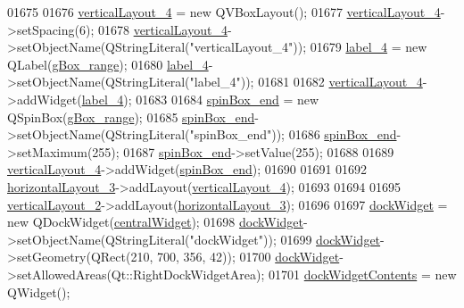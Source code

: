 \begin{DoxyCode}
01675 
01676         \hyperlink{a00080_a6f40fc110b15410c00837a446d57bdbe}{verticalLayout\_4} = \textcolor{keyword}{new} QVBoxLayout();
01677         \hyperlink{a00080_a6f40fc110b15410c00837a446d57bdbe}{verticalLayout\_4}->setSpacing(6);
01678         \hyperlink{a00080_a6f40fc110b15410c00837a446d57bdbe}{verticalLayout\_4}->setObjectName(QStringLiteral(\textcolor{stringliteral}{"verticalLayout\_4"}));
01679         \hyperlink{a00080_a78c7e10730b43c6700cd7216911ed76a}{label\_4} = \textcolor{keyword}{new} QLabel(\hyperlink{a00080_a3c12d0504a310784c3820d1a9ad469c2}{gBox\_range});
01680         \hyperlink{a00080_a78c7e10730b43c6700cd7216911ed76a}{label\_4}->setObjectName(QStringLiteral(\textcolor{stringliteral}{"label\_4"}));
01681 
01682         \hyperlink{a00080_a6f40fc110b15410c00837a446d57bdbe}{verticalLayout\_4}->addWidget(\hyperlink{a00080_a78c7e10730b43c6700cd7216911ed76a}{label\_4});
01683 
01684         \hyperlink{a00080_a8ebeb5caa10878d7806d1f548913b449}{spinBox\_end} = \textcolor{keyword}{new} QSpinBox(\hyperlink{a00080_a3c12d0504a310784c3820d1a9ad469c2}{gBox\_range});
01685         \hyperlink{a00080_a8ebeb5caa10878d7806d1f548913b449}{spinBox\_end}->setObjectName(QStringLiteral(\textcolor{stringliteral}{"spinBox\_end"}));
01686         \hyperlink{a00080_a8ebeb5caa10878d7806d1f548913b449}{spinBox\_end}->setMaximum(255);
01687         \hyperlink{a00080_a8ebeb5caa10878d7806d1f548913b449}{spinBox\_end}->setValue(255);
01688 
01689         \hyperlink{a00080_a6f40fc110b15410c00837a446d57bdbe}{verticalLayout\_4}->addWidget(\hyperlink{a00080_a8ebeb5caa10878d7806d1f548913b449}{spinBox\_end});
01690 
01691 
01692         \hyperlink{a00080_a03ce63974cc69b067c91bbf285cceca8}{horizontalLayout\_3}->addLayout(\hyperlink{a00080_a6f40fc110b15410c00837a446d57bdbe}{verticalLayout\_4});
01693 
01694 
01695         \hyperlink{a00080_a0c01bad60d9f422a1258e710635a2f65}{verticalLayout\_2}->addLayout(\hyperlink{a00080_a03ce63974cc69b067c91bbf285cceca8}{horizontalLayout\_3});
01696 
01697         \hyperlink{a00080_ac8a083c4b66fb317a9b538409ce412e2}{dockWidget} = \textcolor{keyword}{new} QDockWidget(\hyperlink{a00080_a30075506c2116c3ed4ff25e07ae75f81}{centralWidget});
01698         \hyperlink{a00080_ac8a083c4b66fb317a9b538409ce412e2}{dockWidget}->setObjectName(QStringLiteral(\textcolor{stringliteral}{"dockWidget"}));
01699         \hyperlink{a00080_ac8a083c4b66fb317a9b538409ce412e2}{dockWidget}->setGeometry(QRect(210, 700, 356, 42));
01700         \hyperlink{a00080_ac8a083c4b66fb317a9b538409ce412e2}{dockWidget}->setAllowedAreas(Qt::RightDockWidgetArea);
01701         \hyperlink{a00080_a765ded8236736213d556f6f91941808e}{dockWidgetContents} = \textcolor{keyword}{new} QWidget();

\end{DoxyCode}
